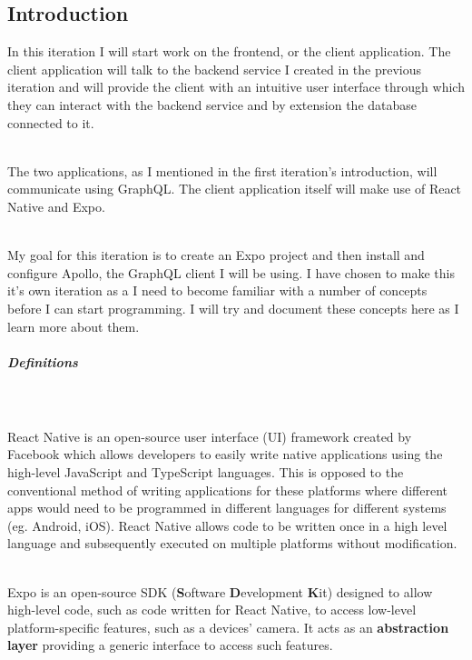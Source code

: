 \documentclass[../../main.tex]{subfiles}
\begin{document}
\subsection{Introduction}

In this iteration I will start work on the frontend, or the client application. The client
application will talk to the backend service I created in the previous iteration and will
provide the client with an intuitive user interface through which they can interact with the
backend service and by extension the database connected to it.

\noindent \\ The two applications, as I mentioned in the first iteration's introduction,
will communicate using GraphQL. The client application itself will make use of
React Native and Expo.

\noindent \\ My goal for this iteration is to create an Expo project
and then install and configure Apollo, the GraphQL client I will be
using. I have chosen to make this it's own iteration as a I need to
become familiar with a number of concepts before I can start programming.
I will try and document these concepts here as I learn more about them.

\subparagraph{Definitions}

\noindent \\\\ React Native is an open-source user interface (UI) framework created by
Facebook which allows developers to easily write native applications using
the high-level JavaScript and TypeScript languages. This is opposed to the conventional method
of writing applications for these platforms where different apps would need to be programmed
in different languages for different systems (eg. Android, iOS). React Native allows code to
be written once in a high level language and subsequently executed on multiple
platforms without modification.

\noindent \\ Expo is an open-source SDK (\textbf{S}oftware \textbf{D}evelopment \textbf{K}it) designed to allow high-level code, such as code
written for React Native, to access low-level platform-specific features, such as a devices' camera.
It acts as an \textbf{abstraction layer} providing a generic interface to access such features.

\begin{comment}
\noindent \\ Therefore, the first task to do is to initialise an Expo project and install
our dependencies, notably the Apollo GraphQL client.\
\end{comment}
\end{document}
